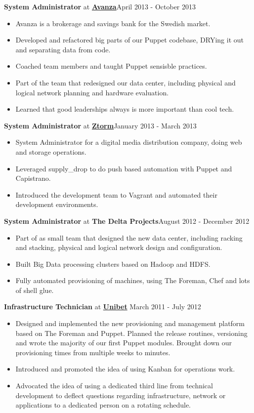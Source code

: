 \documentclass[10pt,sans]{moderncv}
\newenvironment{outerlist}[1][\enskip\textbullet]%
        {\begin{itemize}[#1]}{\end{itemize}%
         \vspace{-.6\baselineskip}}
\newcommand{\blankline}{\quad\pagebreak[2]}
\begin{document}
\textbf{System Administrator} at \href{http://www.avanza.se}{\textbf{Avanza}}\hfill {April 2013 - October 2013}
\begin{outerlist}
\item[] Avanza is a brokerage and savings bank for the Swedish market.

	\item Developed and refactored big parts of our Puppet codebase, DRYing it out and separating data from code.
	\item Coached team members and taught Puppet sensisble practices.
	\item Part of the team that redesigned our data center, including physical and logical network planning and hardware evaluation.
	\item Learned that good leaderships always is more important than cool tech.

\end{outerlist}
\blankline

\textbf{System Administrator} at \href{http://www.ztorm.com}{\textbf{Ztorm}}\hfill {January 2013 - March 2013}
\begin{outerlist}
\item[] System Administrator for a digital media distribution company, doing web and storage operations. 

	\item Leveraged supply\_drop to do push based automation with Puppet and Capistrano.
	\item Introduced the development team to Vagrant and automated their development environments.
\end{outerlist}
\blankline

\textbf{System Administrator} at {\textbf{The Delta Projects}}\hfill {August 2012 - December 2012}
\begin{outerlist}
	\item Part of as small team that designed the new data center, including racking and stacking, physical and logical network design and configuration.
	\item Built Big Data processing clusters based on Hadoop and HDFS.
	\item Fully automated provisioning of machines, using The Foreman, Chef and lots of shell glue.
\end{outerlist}
\blankline

\textbf{Infrastructure Technician} at \href{http://www.unibet.com}{\textbf{Unibet}}  \hfill {March 2011 - July 2012}
\begin{outerlist}
	 \item Designed and implemented the new provisioning and management platform based on The Foreman and Puppet. Planned the release routines, versioning and wrote the majority of our first Puppet modules. Brought down our provisioning times from multiple weeks to minutes.
	\item Introduced and promoted the idea of using Kanban for operations work.
	\item Advocated the idea of using a dedicated third line from technical development to deflect questions regarding infrastructure, network or applications to a dedicated person on a rotating schedule.
\end{outerlist}
\blankline
\end{document}
